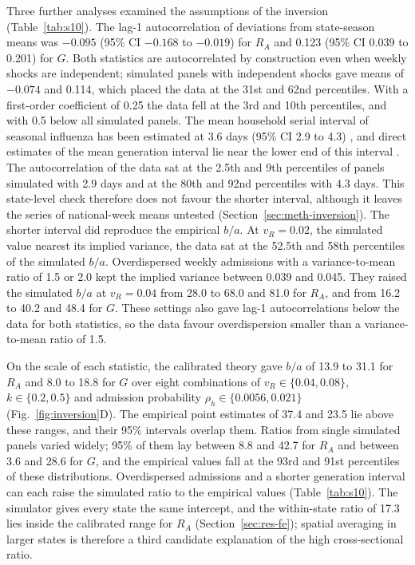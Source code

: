 Three further analyses examined the assumptions of the inversion (Table~\ref{tab:s10}). The lag-1 autocorrelation of deviations from state-season means was $-0.095$ (95\% CI $-0.168$ to $-0.019$) for $R_A$ and 0.123 (95\% CI 0.039 to 0.201) for $G$. Both statistics are autocorrelated by construction even when weekly shocks are independent; simulated panels with independent shocks gave means of $-0.074$ and 0.114, which placed the data at the 31st and 62nd percentiles. With a first-order coefficient of 0.25 the data fell at the 3rd and 10th percentiles, and with 0.5 below all simulated panels. The mean household serial interval of seasonal influenza has been estimated at 3.6 days (95\% CI 2.9 to 4.3) \citep{cowling2009estimation}, and direct estimates of the mean generation interval lie near the lower end of this interval \citep{chan2025estimating}. The autocorrelation of the data sat at the 2.5th and 9th percentiles of panels simulated with 2.9 days and at the 80th and 92nd percentiles with 4.3 days. This state-level check therefore does not favour the shorter interval, although it leaves the series of national-week means untested (Section~\ref{sec:meth-inversion}). The shorter interval did reproduce the empirical $b/a$. At $v_R=0.02$, the simulated value nearest its implied variance, the data sat at the 52.5th and 58th percentiles of the simulated $b/a$. Overdispersed weekly admissions with a variance-to-mean ratio of 1.5 or 2.0 kept the implied variance between 0.039 and 0.045. They raised the simulated $b/a$ at $v_R=0.04$ from 28.0 to 68.0 and 81.0 for $R_A$, and from 16.2 to 40.2 and 48.4 for $G$. These settings also gave lag-1 autocorrelations below the data for both statistics, so the data favour overdispersion smaller than a variance-to-mean ratio of 1.5.

On the scale of each statistic, the calibrated theory gave $b/a$ of 13.9 to 31.1 for $R_A$ and 8.0 to 18.8 for $G$ over eight combinations of $v_R\in\{0.04,0.08\}$, $k\in\{0.2,0.5\}$ and admission probability $\rho_h\in\{0.0056,0.021\}$ (Fig.~\ref{fig:inversion}D). The empirical point estimates of 37.4 and 23.5 lie above these ranges, and their 95\% intervals overlap them. Ratios from single simulated panels varied widely; 95\% of them lay between 8.8 and 42.7 for $R_A$ and between 3.6 and 28.6 for $G$, and the empirical values fall at the 93rd and 91st percentiles of these distributions. Overdispersed admissions and a shorter generation interval can each raise the simulated ratio to the empirical values (Table~\ref{tab:s10}). The simulator gives every state the same intercept, and the within-state ratio of 17.3 lies inside the calibrated range for $R_A$ (Section~\ref{sec:res-fe}); spatial averaging in larger states is therefore a third candidate explanation of the high cross-sectional ratio.

